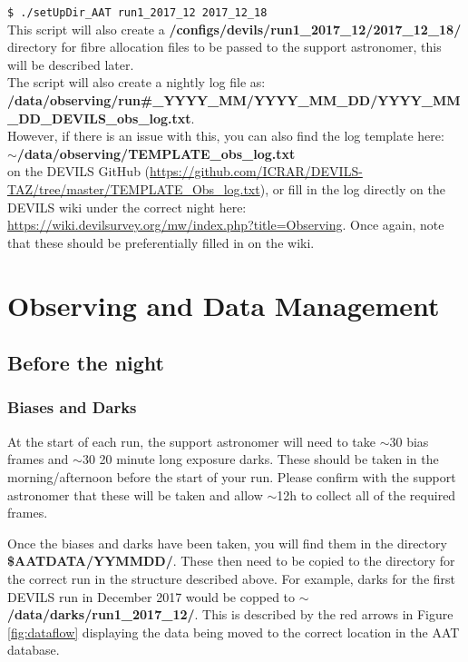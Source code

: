 \documentclass[12pt]{article}
\begin{document}
\hspace{10mm} \texttt{\$ ./setUpDir\_AAT run1\_2017\_12 2017\_12\_18} \\
 
This script will also create a \textbf{/configs/devils/run1\_2017\_12/2017\_12\_18/} directory for fibre allocation files to be passed to the support astronomer, this will be described later. \\ 

The script will also create a nightly log file as: \\

\textbf{/data/observing/run\#\_YYYY\_MM/YYYY\_MM\_DD/YYYY\_MM\_DD\_DEVILS\_obs\_log.txt}. \\

However, if there is an issue with this, you can also find the log template here: \\

 \textbf{$\sim$/data/observing/TEMPLATE\_obs\_log.txt} \\
 
on the DEVILS GitHub (\url{https://github.com/ICRAR/DEVILS-TAZ/tree/master/TEMPLATE\_Obs\_log.txt}), or fill in the log directly on the DEVILS wiki under the correct night here: \url{https://wiki.devilsurvey.org/mw/index.php?title=Observing}. Once again, note that these should be preferentially filled in on the wiki.   


\section{Observing and Data Management}

\subsection{Before the night}

\subsubsection{Biases and Darks}

At the start of each run, the support astronomer will need to take $\sim30$ bias frames and $\sim30$ 20 minute long exposure darks.  These should be taken in the morning/afternoon before the start of your run. Please confirm with the support astronomer that these will be taken and allow $\sim$12h to collect all of the required frames.  

Once the biases and darks have been taken, you will find them in the directory \textbf{\$AATDATA/YYMMDD/}. These then need to be copied to the directory for the correct run in the structure described above. For example, darks  for the first DEVILS run in December 2017 would be copped to \textbf{$\sim$/data/darks/run1\_2017\_12/}. This is described by the red arrows in Figure \ref{fig:dataflow} displaying the data being moved to the correct location in the AAT database. \\   
\end{document}
